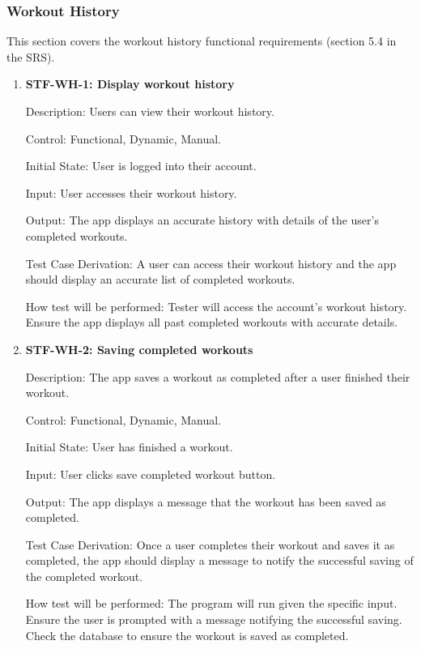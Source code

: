 \documentclass[12pt, titlepage]{article}
\begin{document}
\subsubsection{Workout History}
This section covers the workout history functional requirements (section 5.4 in the SRS).

\begin{enumerate}

\item{\textbf{STF-WH-1: Display workout history}\\}

Description: Users can view their workout history. 
	
Control: Functional, Dynamic, Manual.

Initial State: User is logged into their account.

Input: User accesses their workout history.

Output: The app displays an accurate history with details of the user’s completed workouts.

Test Case Derivation: A user can access their workout history and the app should display an accurate list of completed workouts.

How test will be performed: Tester will access the account’s workout history. Ensure the app displays all past completed workouts with accurate details.

\item{\textbf{STF-WH-2: Saving completed workouts}\\}

Description: The app saves a workout as completed after a user finished their workout.
	
Control: Functional, Dynamic, Manual.

Initial State: User has finished a workout.

Input: User clicks save completed workout button.

Output: The app displays a message that the workout has been saved as completed.

Test Case Derivation: Once a user completes their workout and saves it as completed, the app should display a message to notify the successful saving of the completed workout.

How test will be performed: The program will run given the specific input. Ensure the user is prompted with a message notifying the successful saving. Check the database to ensure the workout is saved as completed.
 
\end{enumerate}
\end{document}
